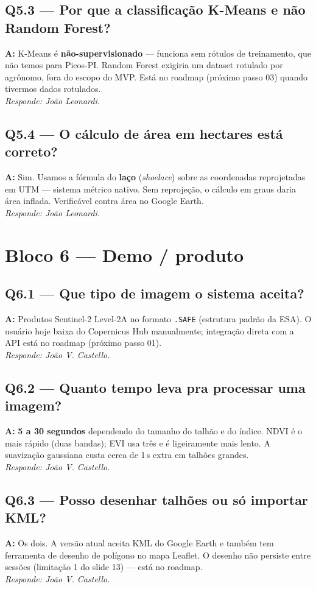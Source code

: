 \documentclass[12pt,a4paper]{article}
\begin{document}
\subsection*{Q5.3 — Por que a classificação K-Means e não Random Forest?}
\textbf{A:} K-Means é \textbf{não-supervisionado} — funciona sem rótulos
de treinamento, que não temos para Picos-PI. Random Forest exigiria um
dataset rotulado por agrônomo, fora do escopo do MVP. Está no roadmap
(próximo passo 03) quando tivermos dados rotulados.
\\[2pt] \textit{Responde: João Leonardi.}

\subsection*{Q5.4 — O cálculo de área em hectares está correto?}
\textbf{A:} Sim. Usamos a fórmula do \textbf{laço} (\textit{shoelace}) sobre
as coordenadas reprojetadas em UTM — sistema métrico nativo. Sem
reprojeção, o cálculo em graus daria área inflada. Verificável contra área
no Google Earth.
\\[2pt] \textit{Responde: João Leonardi.}

\section*{Bloco 6 — Demo / produto}

\subsection*{Q6.1 — Que tipo de imagem o sistema aceita?}
\textbf{A:} Produtos Sentinel-2 Level-2A no formato \texttt{.SAFE} (estrutura
padrão da ESA). O usuário hoje baixa do Copernicus Hub manualmente; integração
direta com a API está no roadmap (próximo passo 01).
\\[2pt] \textit{Responde: João V. Castello.}

\subsection*{Q6.2 — Quanto tempo leva pra processar uma imagem?}
\textbf{A:} \textbf{5 a 30 segundos} dependendo do tamanho do talhão e do
índice. NDVI é o mais rápido (duas bandas); EVI usa três e é ligeiramente
mais lento. A suavização gaussiana custa cerca de 1\,s extra em talhões grandes.
\\[2pt] \textit{Responde: João V. Castello.}

\subsection*{Q6.3 — Posso desenhar talhões ou só importar KML?}
\textbf{A:} Os dois. A versão atual aceita KML do Google Earth e
também tem ferramenta de desenho de polígono no mapa Leaflet. O desenho
não persiste entre sessões (limitação 1 do slide 13) — está no roadmap.
\\[2pt] \textit{Responde: João V. Castello.}
\end{document}
